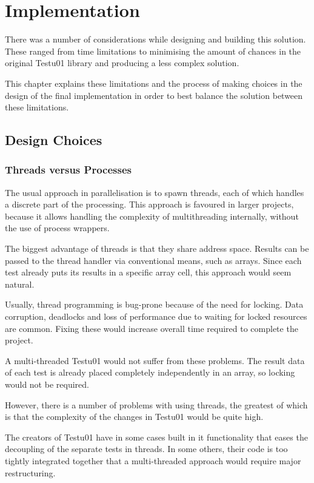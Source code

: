 \chapter{Implementation}
\label{cha:imp}
There was a number of considerations while designing and building this solution. These ranged from time limitations to minimising the amount of chances in the original Testu01 library and producing a less complex solution. 

This chapter explains these limitations and the process of making choices in the design of the final implementation in order to best balance the solution between these limitations.

\section{Design Choices}
\subsection{Threads versus Processes}
\label{sec:processes}
The usual approach in parallelisation is to spawn threads, each of which handles a discrete part of the processing. This approach is favoured in larger projects, because it allows handling the complexity of multithreading internally, without the use of process wrappers.

The biggest advantage of threads is that they share address space. Results can be passed to the thread handler via conventional means, such as arrays. Since each test already puts its results in a specific array cell, this approach would seem natural.

Usually, thread programming is bug-prone because of the need for locking. Data corruption, deadlocks and loss of performance due to waiting for locked resources are common\cite{ers-artofunix}. Fixing these would increase overall time required to complete the project.

A multi-threaded Testu01 would not suffer from these problems. The result data of each test is already placed completely independently in an array, so locking would not be required.

However, there is a number of problems with using threads, the greatest of which is that the complexity of the changes in Testu01 would be quite high. 

The creators of Testu01 have in some cases built in it functionality that eases the decoupling of the separate tests in threads. In some others, their code is too tightly integrated together that a multi-threaded approach would require major restructuring. 


